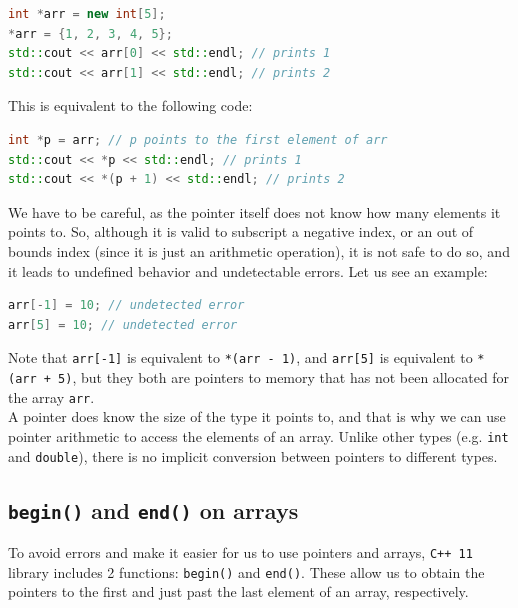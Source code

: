 \begin{lstlisting}[language=C++]
int *arr = new int[5];
*arr = {1, 2, 3, 4, 5};
std::cout << arr[0] << std::endl; // prints 1
std::cout << arr[1] << std::endl; // prints 2
\end{lstlisting}

This is equivalent to the following code:\\

\begin{lstlisting}[language=C++]
int *p = arr; // p points to the first element of arr
std::cout << *p << std::endl; // prints 1
std::cout << *(p + 1) << std::endl; // prints 2
\end{lstlisting}

We have to be careful, as the pointer itself does not know how many elements it points to. So, although it is valid to
subscript a negative index, or an out of bounds index (since it is just an arithmetic operation), it is not safe to do so, and
it leads to undefined behavior and undetectable errors. Let us see an example:\\

\begin{lstlisting}[language=C++]
arr[-1] = 10; // undetected error
arr[5] = 10; // undetected error
\end{lstlisting}

Note that \texttt{arr[-1]} is equivalent to \texttt{*(arr - 1)}, and \texttt{arr[5]} is equivalent to \texttt{*(arr + 5)}, but
they both are pointers to memory that has not been allocated for the array \texttt{arr}.\\

A pointer does know the size of the type it points to, and that is why we can use pointer arithmetic to access the elements of an array.
Unlike other types (e.g. \texttt{int} and \texttt{double}), there is no implicit conversion between pointers to different types.

\subsection{\texttt{begin()} and \texttt{end()} on arrays}

To avoid errors and make it easier for us to use pointers and arrays,
\texttt{C++ 11} library includes 2 functions: \texttt{begin()} and \texttt{end()}.
These allow us to obtain the pointers to the first and just past the last element of an
array, respectively.\\

